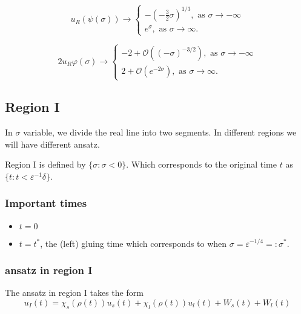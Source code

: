 \documentclass[letterpaper,11pt]{article}
\newcommand{\rmO}{\mathcal{O}}
\newcommand{\eps}{\varepsilon}
\numberwithin{equation}{section}
\theoremstyle{plain}
\begin{document}
\begin{equation*}
u_R(\psi(\sigma)) \to \begin{cases}
 -(-\frac{3}{2}\sigma)^{1/3}, \text{ as }\sigma \to -\infty\\
e^{\sigma} , \text{ as }\sigma \to \infty.
\end{cases}
\end{equation*}

\begin{equation*}
2u_R\varphi(\sigma) \to\begin{cases}
-2+ \rmO((-\sigma)^{-3/2}), \text{ as }\sigma \to -\infty\\
2+ \rmO(e^{-2\sigma}), \text{ as }\sigma \to \infty.
\end{cases}
\end{equation*}
%
\fi
\subsection{Region I}
In $\sigma$ variable, we divide the real line into two segments. In different regions we will have different ansatz.

Region I is defined by $\{ \sigma : \sigma<0 \}$. Which corresponds to the original time $t$ as $\{ t : t< \eps^{-1}\delta\}$.
\subsubsection{Important times}
\begin{itemize}
\item $t= 0$
\item $t = t^*$, the (left) gluing time which corresponds to when $\sigma = \eps^{-1/4}=:\sigma^*$.

\end{itemize}

\subsubsection{ansatz in region I}
The ansatz in region I takes the form
\[
u_I(t) = \chi_s(\rho(t))u_s(t) + \chi_l(\rho(t))u_l(t) + W_s(t)+W_l(t)
\]
\end{document}

